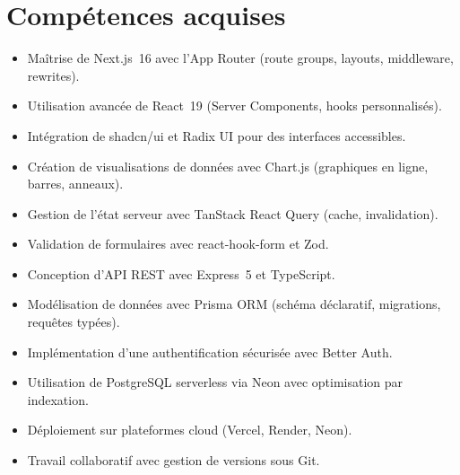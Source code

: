\documentclass[11pt,a4paper]{report}
\begin{document}
\section{Compétences acquises}
\begin{itemize}
  \item Maîtrise de Next.js~16 avec l'App Router (route groups, layouts,
        middleware, rewrites).
  \item Utilisation avancée de React~19 (Server Components, hooks personnalisés).
  \item Intégration de shadcn/ui et Radix UI pour des interfaces accessibles.
  \item Création de visualisations de données avec Chart.js (graphiques en ligne,
        barres, anneaux).
  \item Gestion de l'état serveur avec TanStack React Query (cache, invalidation).
  \item Validation de formulaires avec react-hook-form et Zod.
  \item Conception d'API REST avec Express~5 et TypeScript.
  \item Modélisation de données avec Prisma ORM (schéma déclaratif, migrations,
        requêtes typées).
  \item Implémentation d'une authentification sécurisée avec Better Auth.
  \item Utilisation de PostgreSQL serverless via Neon avec optimisation par
        indexation.
  \item Déploiement sur plateformes cloud (Vercel, Render, Neon).
  \item Travail collaboratif avec gestion de versions sous Git.
\end{itemize}
\end{document}
